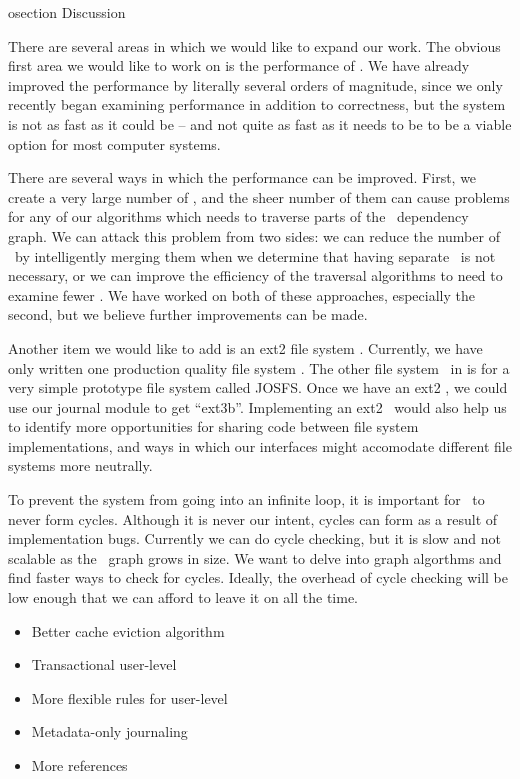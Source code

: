 osection {Discussion}
\label{sec:discussion}

There are several areas in which we would like to expand our work. The obvious
first area we would like to work on is the performance of \Kudos. We have
already improved the performance by literally several orders of magnitude, since
we only recently began examining performance in addition to correctness, but the
system is not as fast as it could be -- and not quite as fast as it needs to be
to be a viable option for most computer systems.

There are several ways in which the performance can be improved. First, we
create a very large number of \chdescs, and the sheer number of them can cause
problems for any of our algorithms which needs to traverse parts of the \chdesc\
dependency graph. We can attack this problem from two sides: we can reduce the
number of \chdescs\ by intelligently merging them when we determine that having
separate \chdescs\ is not necessary, or we can improve the efficiency of the
traversal algorithms to need to examine fewer \chdescs. We have worked on both
of these approaches, especially the second, but we believe further improvements
can be made.

Another item we would like to add is an ext2 file system \module. Currently,
we have only written one production quality file system \module. The other
file system \module\ in \Kudos is for a very simple prototype file system
called JOSFS. Once we have an ext2 \module, we could use our journal module to
get ``ext3b''. Implementing an ext2 \module\ would also help us to identify
more opportunities for sharing code between file system implementations, and
ways in which our interfaces might accomodate different file systems more
neutrally.

To prevent the system from going into an infinite loop, it is important for
\chdescs\ to never form cycles. Although it is never our intent, cycles can
form as a result of implementation bugs. Currently we can do cycle checking,
but it is slow and not scalable as the \chdesc\ graph grows in size. We want to
delve into graph algorthms and find faster ways to check for cycles. Ideally,
the overhead of cycle checking will be low enough that we can afford to leave
it on all the time.

\begin{itemize}
\item Better cache eviction algorithm
\item Transactional user-level \chdescs
\item More flexible rules for user-level \chdescs
\item Metadata-only journaling
\item More references
\end{itemize}
